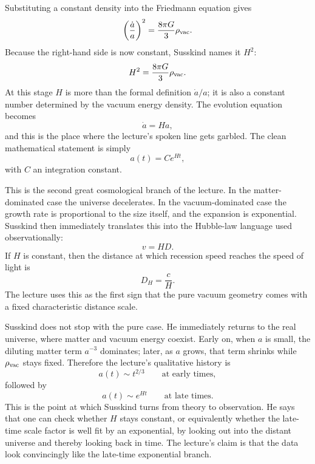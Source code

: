Substituting a constant density into the Friedmann equation gives
\begin{equation}
\left(\frac{\dot a}{a}\right)^2=\frac{8\pi G}{3}\rho_{\rm vac}.
\end{equation}
Because the right-hand side is now constant, Susskind names it \(H^2\):
\begin{equation}
H^2=\frac{8\pi G}{3}\rho_{\rm vac}.
\end{equation}
At this stage \(H\) is more than the formal definition \(\dot a/a\); it is also a constant number determined by the vacuum energy density. The evolution equation becomes
\begin{equation}
\dot a=Ha,
\end{equation}
and this is the place where the lecture's spoken line gets garbled. The clean mathematical statement is simply
\begin{equation}
a(t)=C e^{Ht},
\end{equation}
with \(C\) an integration constant.

This is the second great cosmological branch of the lecture. In the matter-dominated case the universe decelerates. In the vacuum-dominated case the growth rate is proportional to the size itself, and the expansion is exponential. Susskind then immediately translates this into the Hubble-law language used observationally:
\begin{equation}
v=HD.
\end{equation}
If \(H\) is constant, then the distance at which recession speed reaches the speed of light is
\begin{equation}
D_H=\frac{c}{H}.
\end{equation}
The lecture uses this as the first sign that the pure vacuum geometry comes with a fixed characteristic distance scale.

Susskind does not stop with the pure case. He immediately returns to the real universe, where matter and vacuum energy coexist. Early on, when \(a\) is small, the diluting matter term \(a^{-3}\) dominates; later, as \(a\) grows, that term shrinks while \(\rho_{\rm vac}\) stays fixed. Therefore the lecture's qualitative history is
\begin{equation}
a(t)\sim t^{2/3}\qquad\text{at early times},
\end{equation}
followed by
\begin{equation}
a(t)\sim e^{Ht}\qquad\text{at late times}.
\end{equation}
This is the point at which Susskind turns from theory to observation. He says that one can check whether \(H\) stays constant, or equivalently whether the late-time scale factor is well fit by an exponential, by looking out into the distant universe and thereby looking back in time. The lecture's claim is that the data look convincingly like the late-time exponential branch.

